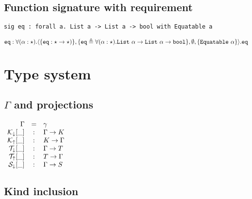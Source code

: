 \documentclass{article}[11pt]
\newcommand{\term}[1]{\verb~#1~}
\begin{document}
    \subsection{Function signature with requirement}\label{subsec:function-signature-with-requirement}

    \begin{verbatim}
sig eq : forall a. List a -> List a -> bool with Equatable a
    \end{verbatim}

    \noindent
    \begin{math}
        \term{eq} : \forall(\alpha:\star).\langle
        \{ \term{eq} : \star \rightarrow \star)\},
        \{ \term{eq} \triangleq \forall(\alpha:\star).\term{List}~\alpha \rightarrow \term{List}~\alpha \rightarrow \term{bool} \},
        \emptyset,
        \{ \term{Equatable} ~ \alpha \}
        \rangle.\term{eq}
    \end{math}


    \section{Type system}\label{sec:type-system}

    \subsection{$\Gamma$ and projections}\label{subsec:gamma-and-projections}

    \begin{math}
        \begin{array}{rcl}
            \Gamma                  & = & \gamma \\
            {\cal K}_\downarrow[\_] & : & \Gamma \rightarrow K \\
            {\cal K}_\uparrow[\_]   & : & K \rightarrow \Gamma \\
            {\cal T}_\downarrow[\_] & : & \Gamma \rightarrow T \\
            {\cal T}_\uparrow[\_]   & : & T \rightarrow \Gamma \\
            {\cal S}_\downarrow[\_] & : & \Gamma \rightarrow S \\
        \end{array}
    \end{math}

    \subsection{Kind inclusion}\label{subsec:kind-inclusion}
\end{document}
